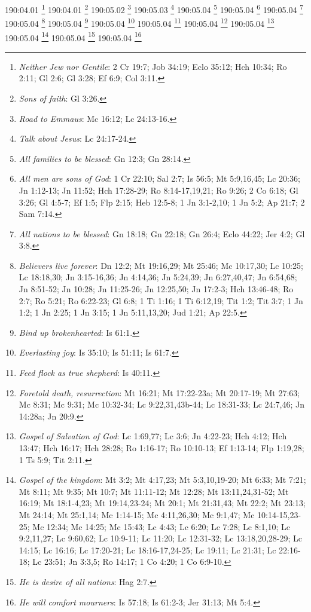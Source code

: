 190:04.01 \footnote{\textit{Neither Jew nor Gentile}: 2 Cr 19:7; Job 34:19; Eclo 35:12; Hch 10:34; Ro 2:11; Gl 2:6; Gl 3:28; Ef 6:9; Col 3:11.}
190:04.01 \footnote{\textit{Sons of faith}: Gl 3:26.}
190:05.02 \footnote{\textit{Road to Emmaus}: Mc 16:12; Lc 24:13-16.}
190:05.03 \footnote{\textit{Talk about Jesus}: Lc 24:17-24.}
190:05.04 \footnote{\textit{All families to be blessed}: Gn 12:3; Gn 28:14.}
190:05.04 \footnote{\textit{All men are sons of God}: 1 Cr 22:10; Sal 2:7; Is 56:5; Mt 5:9,16,45; Lc 20:36; Jn 1:12-13; Jn 11:52; Hch 17:28-29; Ro 8:14-17,19,21; Ro 9:26; 2 Co 6:18; Gl 3:26; Gl 4:5-7; Ef 1:5; Flp 2:15; Heb 12:5-8; 1 Jn 3:1-2,10; 1 Jn 5:2; Ap 21:7; 2 Sam 7:14.}
190:05.04 \footnote{\textit{All nations to be blessed}: Gn 18:18; Gn 22:18; Gn 26:4; Eclo 44:22; Jer 4:2; Gl 3:8.}
190:05.04 \footnote{\textit{Believers live forever}: Dn 12:2; Mt 19:16,29; Mt 25:46; Mc 10:17,30; Lc 10:25; Lc 18:18,30; Jn 3:15-16,36; Jn 4:14,36; Jn 5:24,39; Jn 6:27,40,47; Jn 6:54,68; Jn 8:51-52; Jn 10:28; Jn 11:25-26; Jn 12:25,50; Jn 17:2-3; Hch 13:46-48; Ro 2:7; Ro 5:21; Ro 6:22-23; Gl 6:8; 1 Ti 1:16; 1 Ti 6:12,19; Tit 1:2; Tit 3:7; 1 Jn 1:2; 1 Jn 2:25; 1 Jn 3:15; 1 Jn 5:11,13,20; Jud 1:21; Ap 22:5.}
190:05.04 \footnote{\textit{Bind up brokenhearted}: Is 61:1.}
190:05.04 \footnote{\textit{Everlasting joy}: Is 35:10; Is 51:11; Is 61:7.}
190:05.04 \footnote{\textit{Feed flock as true shepherd}: Is 40:11.}
190:05.04 \footnote{\textit{Foretold death, resurrection}: Mt 16:21; Mt 17:22-23a; Mt 20:17-19; Mt 27:63; Mc 8:31; Mc 9:31; Mc 10:32-34; Lc 9:22,31,43b-44; Lc 18:31-33; Lc 24:7,46; Jn 14:28a; Jn 20:9.}
190:05.04 \footnote{\textit{Gospel of Salvation of God}: Lc 1:69,77; Lc 3:6; Jn 4:22-23; Hch 4:12; Hch 13:47; Hch 16:17; Hch 28:28; Ro 1:16-17; Ro 10:10-13; Ef 1:13-14; Flp 1:19,28; 1 Ts 5:9; Tit 2:11.}
190:05.04 \footnote{\textit{Gospel of the kingdom}: Mt 3:2; Mt 4:17,23; Mt 5:3,10,19-20; Mt 6:33; Mt 7:21; Mt 8:11; Mt 9:35; Mt 10:7; Mt 11:11-12; Mt 12:28; Mt 13:11,24,31-52; Mt 16:19; Mt 18:1-4,23; Mt 19:14,23-24; Mt 20:1; Mt 21:31,43; Mt 22:2; Mt 23:13; Mt 24:14; Mt 25:1,14; Mc 1:14-15; Mc 4:11,26,30; Mc 9:1,47; Mc 10:14-15,23-25; Mc 12:34; Mc 14:25; Mc 15:43; Lc 4:43; Lc 6:20; Lc 7:28; Lc 8:1,10; Lc 9:2,11,27; Lc 9:60,62; Lc 10:9-11; Lc 11:20; Lc 12:31-32; Lc 13:18,20,28-29; Lc 14:15; Lc 16:16; Lc 17:20-21; Lc 18:16-17,24-25; Lc 19:11; Lc 21:31; Lc 22:16-18; Lc 23:51; Jn 3:3,5; Ro 14:17; 1 Co 4:20; 1 Co 6:9-10.}
190:05.04 \footnote{\textit{He is desire of all nations}: Hag 2:7.}
190:05.04 \footnote{\textit{He will comfort mourners}: Is 57:18; Is 61:2-3; Jer 31:13; Mt 5:4.}
